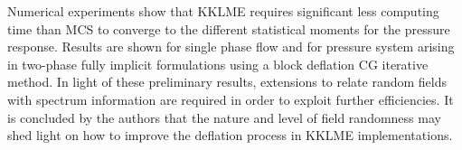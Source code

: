 \documentclass{report}
\begin{document}
Numerical experiments show that KKLME requires significant less computing
time than MCS to converge to the different statistical moments for the
pressure response. Results are shown for single phase flow and for
pressure system arising in two-phase fully implicit formulations using a
block deflation CG iterative method. In light of these preliminary
results, extensions to relate random fields with spectrum information are
required in order to exploit further efficiencies. It is concluded by the
authors that the nature and level of field randomness may shed light on
how to improve the deflation process in KKLME implementations.
\end{document}

